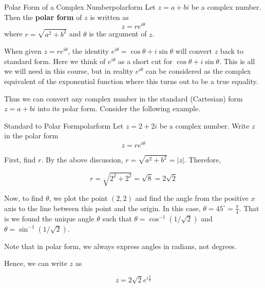 \begin{definition}{Polar Form of a Complex Number}{polarform}
Let $z = a + bi$ be a complex number. Then the \textbf{polar form} of $z$ is written as 
\[
z = re^{i\theta}
\]
where $r = \sqrt{a^2 + b^2}$ and $\theta$ is the argument of $z$. 
\end{definition}

When given $z = re^{i\theta}$, the identity $e^{i\theta} = \cos\theta + i \sin\theta$ will convert $z$ back to standard form. Here we think of $ e^{i \theta}$ as a short cut for $ \cos \theta
+i\sin \theta$. This is all we will need in this course, but in
reality $e^{i \theta}$ can be considered as the complex equivalent of
the exponential function where this turns out to be a true equality.

\begin{center}
\end{center}

Thus we can convert any complex number in the standard (Cartesian) form $z = a+bi$
into its polar form. Consider the following example.

\begin{example}{Standard to Polar Form}{polarform}
Let $z = 2 + 2i$ be a complex number. 
Write $z$ in the polar form 
\begin{equation*}
z = re^{i \theta}
\end{equation*}
\end{example}

\begin{solution}
First, find $r$.
By the above discussion, $r=\sqrt{
a^{2}+b^{2}} = |z|$. Therefore,

\begin{equation*}
r = \sqrt{2^{2} + 2^{2}} = \sqrt{8} =2\sqrt{2}
\end{equation*}

Now, to find $\theta$, we plot the point $\left( 2, 2 \right)$ and
find the angle from the positive $x$ axis to the line between this
point and the origin. In this case, $\theta = 45^{\circ} =
\frac{\pi}{4}$.  That is we found the unique angle $\theta$ such that 
$\theta = \cos^{-1}(1/\sqrt{2})$ and $\theta = \sin^{-1}(1/\sqrt{2})$. 

Note that in polar form, we always express angles in radians, not degrees.

Hence, we can write $z$ as

\begin{equation*}
z = 2\sqrt{2} e^{i\frac{\pi}{4}}
\end{equation*}

\end{solution}

